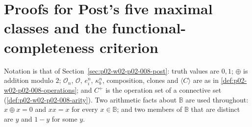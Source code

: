 \section{Proofs for Post's five maximal classes and the functional-completeness criterion}
\label{sec:annex-p02-w02-p02-008-post}

Notation is that of Section~\ref{sec:p02-w02-p02-008-post}: truth values are
\(0,1\); \(\oplus\) is addition modulo \(2\); \(\mathcal O_n\),
\(\mathcal O\), \(e^n_i\), \(\kappa^n_b\), composition, clones and
\(\langle C\rangle\) are as in \cref{def:p02-w02-p02-008-operations}; and
\(C^+\) is the operation set of a connective set
(\cref{def:p02-w02-p02-008-arity}).  Two arithmetic facts about \(\mathbb B\)
are used throughout: \(x\oplus x=0\) and \(xx=x\) for every
\(x\in\mathbb B\); and two members of \(\mathbb B\) that are distinct are
\(y\) and \(1-y\) for some \(y\).

